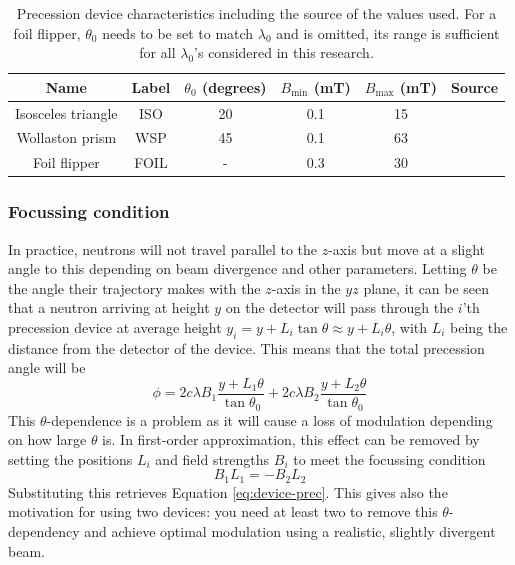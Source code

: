 \documentclass{article}
\begin{document}
\begin{table}[h!]
	\centering
	\begin{tabular}{|c|c|c|c|c|c|}
		\hline
		Name & Label & $\theta_0$ (degrees) & $B_{\text{min}}$ (mT) & $B_{\text{max}}$ (mT) & Source \\
		\hline
		Isosceles triangle & ISO & 20 & 0.1 & 15 & \cite{kusmin2017} \\
		Wollaston prism & WSP & 45 & 0.1 & 63 & \cite{li2021} \\
		Foil flipper & FOIL & - & 0.3 & 30 & \cite{bouwman2011} \\
		\hline
	\end{tabular}
	\caption{Precession device characteristics including the source of the values used. For a foil flipper, $\theta_0$ needs to be set to match $\lambda_0$ and is omitted, its range is sufficient for all $\lambda_0$'s considered in this research.}
	\label{tab:device-properties}
\end{table}
\subsubsection{Focussing condition}
In practice, neutrons will not travel parallel to the $z$-axis but move at a slight angle to this depending on beam divergence and other parameters. Letting $\theta$ be the angle their trajectory makes with the $z$-axis in the $yz$ plane, it can be seen that a neutron arriving at height $y$ on the detector will pass through the $i$'th precession device at average height $y_i = y + L_i\tan\theta \approx y + L_i\theta$, with $L_i$ being the distance from the detector of the device. This means that the total precession angle will be
$$\phi = 2c\lambda B_1\frac{y + L_1\theta}{\tan\theta_0} + 2c\lambda B_2\frac{y + L_2\theta}{\tan\theta_0}$$
This $\theta$-dependence is a problem as it will cause a loss of modulation depending on how large $\theta$ is. In first-order approximation, this effect can be removed by setting the positions $L_i$ and field strengths $B_i$ to meet the focussing condition
$$B_1L_1 = -B_2L_2$$
Substituting this retrieves Equation \eqref{eq:device-prec}. This gives also the motivation for using two devices: you need at least two to remove this $\theta$-dependency and achieve optimal modulation using a realistic, slightly divergent beam.
\end{document}
